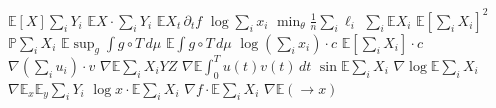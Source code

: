 \documentclass{article}
\begin{document}
$\mathbb{E}[X]\sum_{i}Y_{i}$ $\mathbb{E}X\cdot\sum_{i}Y_{i}$ $\mathbb{E}X_{t}\,\partial_{t}f$ $\log\sum_{i}x_{i}$ $\min_{\theta}\frac{1}{n}\sum_{i}\ell_{i}$
$\sum_{i}\mathbb{E}X_{i}$ $\mathbb{E}\left[\sum_{i}X_{i}\right]^{2}$ $\mathbb{P}\sum_{i}X_{i}$
$\mathbb{E}\sup_{g}\int g\circ T\,d\mu$ $\mathbb{E}\int g\circ T\,d\mu$ $\log(\sum_{i}x_{i})\cdot c$ $\mathbb{E}[\sum_{i}X_{i}]\cdot c$ $\nabla(\sum_{i}u_{i})\cdot v$
$\nabla\mathbb{E}\sum_i X_iYZ$ $\nabla\mathbb{E}\int_0^T u(t)v(t)\,dt$ $\sin\mathbb{E}\sum_i X_i$ $\nabla\log\mathbb{E}\sum_i X_i$
$\nabla\mathbb{E}_x\mathbb{E}_y\sum_i Y_i$ $\log x\cdot\mathbb{E}\sum_i X_i$ $\nabla f\cdot\mathbb{E}\sum_i X_i$ $\nabla\mathbb{E}(\to x)$
\end{document}
